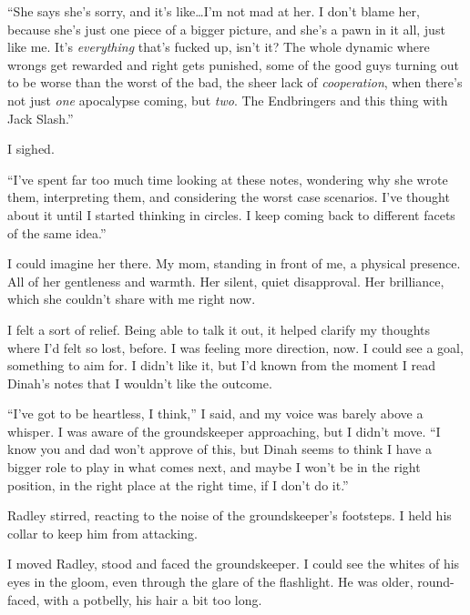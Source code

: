 ``She says she's sorry, and it's like\ldots I'm not mad at her.  I don't blame her, because she's just one piece of a bigger picture, and she's a pawn in it all, just like me.  It's \emph{everything} that's fucked up, isn't it?  The whole dynamic where wrongs get rewarded and right gets punished, some of the good guys turning out to be worse than the worst of the bad, the sheer lack of \emph{cooperation}, when there's not just \emph{one} apocalypse coming, but \emph{two}.  The Endbringers and this thing with Jack Slash.''



I sighed.



``I've spent far too much time looking at these notes, wondering why she wrote them, interpreting them, and considering the worst case scenarios.  I've thought about it until I started thinking in circles.  I keep coming back to different facets of the same idea.''



I could imagine her there.  My mom, standing in front of me, a physical presence.  All of her gentleness and warmth.  Her silent, quiet disapproval.  Her brilliance, which she couldn't share with me right now.



I felt a sort of relief.  Being able to talk it out, it helped clarify my thoughts where I'd felt so lost, before.  I was feeling more direction, now.  I could see a goal, something to aim for.  I didn't like it, but I'd known from the moment I read Dinah's notes that I wouldn't like the outcome.



``I've got to be heartless, I think,'' I said, and my voice was barely above a whisper.  I was aware of the groundskeeper approaching, but I didn't move.  ``I know you and dad won't approve of this, but Dinah seems to think I have a bigger role to play in what comes next, and maybe I won't be in the right position, in the right place at the right time, if I don't do it.''



Radley stirred, reacting to the noise of the groundskeeper's footsteps.  I held his collar to keep him from attacking.



I moved Radley, stood and faced the groundskeeper.  I could see the whites of his eyes in the gloom, even through the glare of the flashlight.  He was older, round-faced, with a potbelly, his hair a bit too long.



